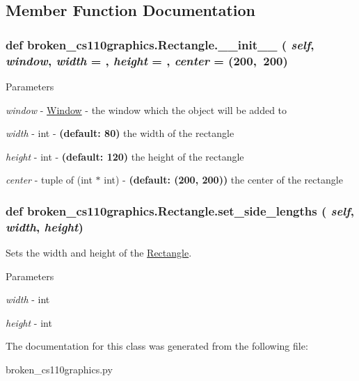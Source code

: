 \subsection{Member Function Documentation}
\hypertarget{classbroken__cs110graphics_1_1Rectangle_a9b24dd6edcd39c6544aaad5f5aab0760}{
\subsubsection[{\_\-\_\-init\_\-\_\-}]{\setlength{\rightskip}{0pt plus 5cm}def broken\_\-cs110graphics.Rectangle.\_\-\_\-init\_\-\_\- ( {\em self}, \/   {\em window}, \/   {\em width} = {}, \/   {\em height} = {}, \/   {\em center} = {\ttfamily (200,~200})}}
\label{classbroken__cs110graphics_1_1Rectangle_a9b24dd6edcd39c6544aaad5f5aab0760}

\begin{DoxyParams}{Parameters}
\item[{\em window}]-\/ \hyperlink{classbroken__cs110graphics_1_1Window}{Window} -\/ the window which the object will be added to \item[{\em width}]-\/ int -\/ {\bfseries (default: 80)} the width of the rectangle \item[{\em height}]-\/ int -\/ {\bfseries (default: 120)} the height of the rectangle \item[{\em center}]-\/ tuple of (int $\ast$ int) -\/ {\bfseries (default: (200, 200))} the center of the rectangle \end{DoxyParams}
\hypertarget{classbroken__cs110graphics_1_1Rectangle_ad7c925f2f7ec960cf4d8e113c180628f}{
\subsubsection[{set\_\-side\_\-lengths}]{\setlength{\rightskip}{0pt plus 5cm}def broken\_\-cs110graphics.Rectangle.set\_\-side\_\-lengths ( {\em self}, \/   {\em width}, \/   {\em height})}}
\label{classbroken__cs110graphics_1_1Rectangle_ad7c925f2f7ec960cf4d8e113c180628f}


Sets the width and height of the \hyperlink{classbroken__cs110graphics_1_1Rectangle}{Rectangle}. 
\begin{DoxyParams}{Parameters}
\item[{\em width}]-\/ int \item[{\em height}]-\/ int \end{DoxyParams}


The documentation for this class was generated from the following file:\begin{DoxyCompactItemize}
\item 
broken\_\-cs110graphics.py\end{DoxyCompactItemize}
